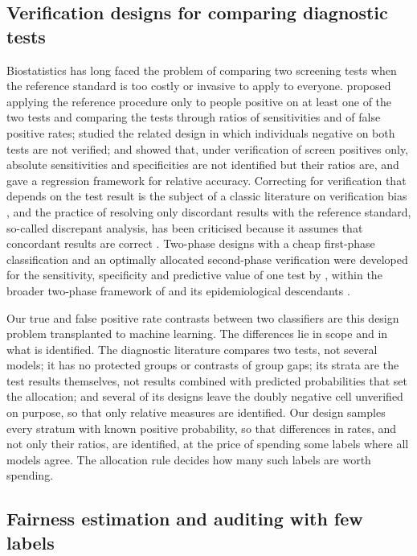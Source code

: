 \subsection{Verification designs for comparing diagnostic tests}

Biostatistics has long faced the problem of comparing two screening tests when the reference standard is too costly or invasive to apply to everyone. \citet{schatzkin1987} proposed applying the reference procedure only to people positive on at least one of the two tests and comparing the tests through ratios of sensitivities and of false positive rates; \citet{chock1997} studied the related design in which individuals negative on both tests are not verified; and \citet{pepe2001comparing} showed that, under verification of screen positives only, absolute sensitivities and specificities are not identified but their ratios are, and gave a regression framework for relative accuracy. Correcting for verification that depends on the test result is the subject of a classic literature on verification bias \citep{begg1983}, and the practice of resolving only discordant results with the reference standard, so-called discrepant analysis, has been criticised because it assumes that concordant results are correct \citep{hadgu1996}. Two-phase designs with a cheap first-phase classification and an optimally allocated second-phase verification were developed for the sensitivity, specificity and predictive value of one test by \citet{mcnamee2002}, within the broader two-phase framework of \citet{neyman1938} and its epidemiological descendants \citep{breslow1988,reilly1995}.

Our true and false positive rate contrasts between two classifiers are this design problem transplanted to machine learning. The differences lie in scope and in what is identified. The diagnostic literature compares two tests, not several models; it has no protected groups or contrasts of group gaps; its strata are the test results themselves, not results combined with predicted probabilities that set the allocation; and several of its designs leave the doubly negative cell unverified on purpose, so that only relative measures are identified. Our design samples every stratum with known positive probability, so that differences in rates, and not only their ratios, are identified, at the price of spending some labels where all models agree. The allocation rule decides how many such labels are worth spending.

\subsection{Fairness estimation and auditing with few labels}

